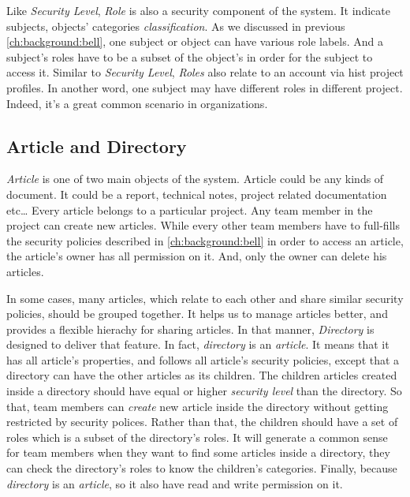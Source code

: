 Like \emph {Security Level}, \emph{Role} is also a security component of the system.
It indicate subjects, objects' categories \ie \emph{classification}.
As we discussed in previous \autoref{ch:background:bell}, one subject or object can have various role labels.
And a subject's roles have to be a subset of the object's in order for the subject to access it.
Similar to \emph{Security Level}, \emph{Roles} also relate to an account via hist project profiles. 
In another word, one subject may have different roles in different project.
Indeed, it's a great common scenario in organizations.



\subsection{Article and Directory}
\label{ch:hopot_project:article}

\emph{Article} is one of two main objects of the system.
Article could be any kinds of document.
It could be a report, technical notes, project related documentation etc\dots
Every article belongs to a particular project.
Any team member in the project can create new articles.
While every other team members have to full-fills the security policies described in \autoref{ch:background:bell} in order to access an article, the article's owner has all permission on it.
And, only the owner can delete his articles.

In some cases, many articles, which relate to each other and share similar security policies, should be grouped together.
It helps us to manage articles better, and provides a flexible hierachy for sharing articles.
In that manner, \emph{Directory} is designed to deliver that feature.
In fact, \emph{directory} is an \emph{article}.
It means that it has all article's properties, and follows all article's security policies, except that a directory can have the other articles as its children.
The children articles created inside a directory should have equal or higher \emph{security level} than the directory.
So that, team members can \emph{create} new article inside the directory without getting restricted by security polices.
Rather than that, the children should have a set of roles which is a subset of the directory's roles.
It will generate a common sense for team members when they want to find some articles inside a directory, they can check the directory's roles to know the children's categories.
Finally, because \emph{directory} is an \emph{article}, so it also have read and write permission on it.

